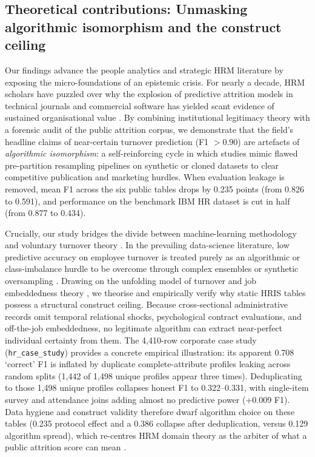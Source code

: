 \documentclass[12pt,a4paper]{article}
\begin{document}
\subsection{Theoretical contributions: Unmasking algorithmic isomorphism and the construct ceiling}
Our findings advance the people analytics and strategic HRM literature \parencite{ref50,ref44,ref51,ref56,ref52} by exposing the micro-foundations of an epistemic crisis. For nearly a decade, HRM scholars have puzzled over why the explosion of predictive attrition models in technical journals and commercial software has yielded scant evidence of sustained organisational value \parencite{ref44,ref45}. By combining institutional legitimacy theory \parencite{ref59,ref51} with a forensic audit of the public attrition corpus, we demonstrate that the field's headline claims of near-certain turnover prediction (F1 $> 0.90$) are artefacts of \textit{algorithmic isomorphism}: a self-reinforcing cycle in which studies mimic flawed pre-partition resampling pipelines on synthetic or cloned datasets to clear competitive publication and marketing hurdles. When evaluation leakage is removed, mean F1 across the six public tables drops by 0.235 points (from 0.826 to 0.591), and performance on the benchmark IBM HR dataset is cut in half (from 0.877 to 0.434).

Crucially, our study bridges the divide between machine-learning methodology and voluntary turnover theory \parencite{ref36,ref46,ref47,ref48,ref62}. In the prevailing data-science literature, low predictive accuracy on employee turnover is treated purely as an algorithmic or class-imbalance hurdle to be overcome through complex ensembles or synthetic oversampling \parencite{ref2,ref3,ref66}. Drawing on the unfolding model of turnover \parencite{ref46} and job embeddedness theory \parencite{ref48}, we theorise and empirically verify why static HRIS tables possess a structural construct ceiling. Because cross-sectional administrative records omit temporal relational shocks, psychological contract evaluations, and off-the-job embeddedness, no legitimate algorithm can extract near-perfect individual certainty from them. The 4,410-row corporate case study (\texttt{hr\_case\_study}) provides a concrete empirical illustration: its apparent 0.708 `correct' F1 is inflated by duplicate complete-attribute profiles leaking across random splits (1,442 of 1,498 unique profiles appear three times). Deduplicating to those 1,498 unique profiles collapses honest F1 to 0.322--0.331, with single-item survey and attendance joins adding almost no predictive power (+0.009 F1). Data hygiene and construct validity therefore dwarf algorithm choice on these tables (0.235 protocol effect and a 0.386 collapse after deduplication, versus 0.129 algorithm spread), which re-centres HRM domain theory as the arbiter of what a public attrition score can mean \parencite{ref50,ref56}.
\end{document}
